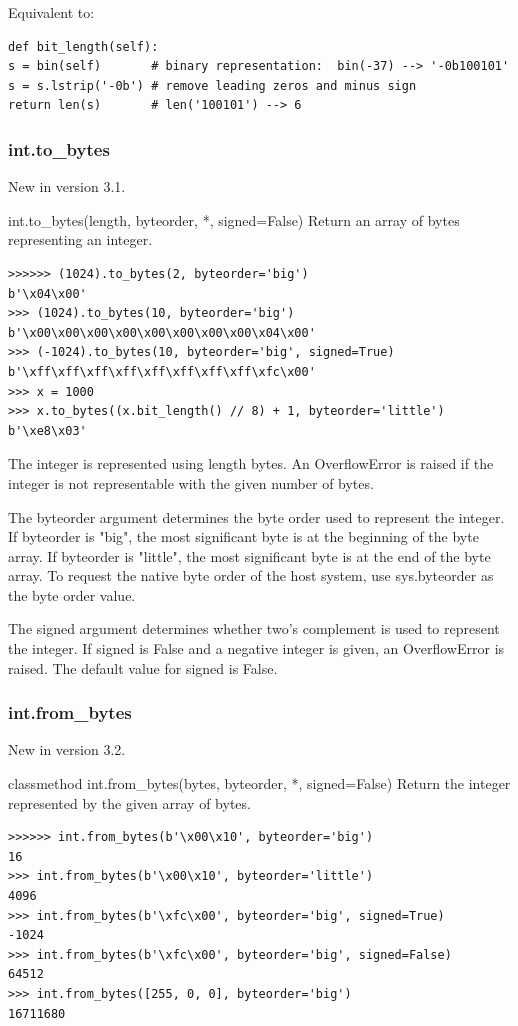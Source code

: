 Equivalent to:

\begin{lstlisting}
def bit_length(self):
s = bin(self)       # binary representation:  bin(-37) --> '-0b100101'
s = s.lstrip('-0b') # remove leading zeros and minus sign
return len(s)       # len('100101') --> 6
\end{lstlisting}


\subsubsection{int.to\_bytes}
New in version 3.1.

int.to\_bytes(length, byteorder, *, signed=False)
Return an array of bytes representing an integer.

\begin{lstlisting}
>>>>>> (1024).to_bytes(2, byteorder='big')
b'\x04\x00'
>>> (1024).to_bytes(10, byteorder='big')
b'\x00\x00\x00\x00\x00\x00\x00\x00\x04\x00'
>>> (-1024).to_bytes(10, byteorder='big', signed=True)
b'\xff\xff\xff\xff\xff\xff\xff\xff\xfc\x00'
>>> x = 1000
>>> x.to_bytes((x.bit_length() // 8) + 1, byteorder='little')
b'\xe8\x03'
\end{lstlisting}

The integer is represented using length bytes. An OverflowError is raised if the integer is not representable with the given number of bytes.

The byteorder argument determines the byte order used to represent the integer. If byteorder is "big", the most significant byte is at the beginning of the byte array. If byteorder is "little", the most significant byte is at the end of the byte array. To request the native byte order of the host system, use sys.byteorder as the byte order value.

The signed argument determines whether two’s complement is used to represent the integer. If signed is False and a negative integer is given, an OverflowError is raised. The default value for signed is False.

\subsubsection{int.from\_bytes}
New in version 3.2.

classmethod int.from\_bytes(bytes, byteorder, *, signed=False)
Return the integer represented by the given array of bytes.

\begin{lstlisting}
>>>>>> int.from_bytes(b'\x00\x10', byteorder='big')
16
>>> int.from_bytes(b'\x00\x10', byteorder='little')
4096
>>> int.from_bytes(b'\xfc\x00', byteorder='big', signed=True)
-1024
>>> int.from_bytes(b'\xfc\x00', byteorder='big', signed=False)
64512
>>> int.from_bytes([255, 0, 0], byteorder='big')
16711680
\end{lstlisting}

